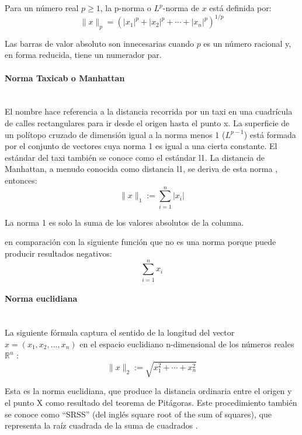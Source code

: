 \documentclass[12pt]{article}
\newcommand{\subsubsubsection}[1]{\paragraph{#1}\mbox{}\\}
\begin{document}
			Para un número real $p \geq 1$, la p-norma o $L^p$-norma de $x$ está definida por:
			\begin{equation}\label{eq:Norma_Lp}
			\parallel x \parallel_p = (|x_{1}|^{p}+|x_{2}|^{p}+\dotsb +|x_{n}|^{p})^{1/p}
			\end{equation}
			
			Las barras de valor absoluto son innecesarias cuando $p$ es un número racional y, en forma reducida, tiene un numerador par.
			
			
			
			\subsubsubsection{Norma Taxicab o Manhattan}
			El nombre hace referencia a la distancia recorrida por un taxi en una cuadrícula de calles rectangulares para ir desde el origen hasta el punto x. La superficie de un polítopo cruzado de dimensión igual a la norma menos 1 ($L^{p-1}$) está formada por el conjunto de vectores cuya norma 1 es igual a una cierta constante. El estándar del taxi también se conoce como el estándar l1. La distancia de Manhattan, a menudo conocida como distancia l1, se deriva de esta norma \cite{Nelson2010}, entonces:
			\begin{equation}\label{eq:Norma_L1}
			\parallel x \parallel_1 := \sum_{i=1}^n |x_i|
			\end{equation}

			La norma 1 es solo la suma de los valores absolutos de la columna.
			
			en comparación con la siguiente función que no es una norma porque puede producir resultados negativos:
			\begin{equation}\label{eq:Norma_L1_not}
			\sum_{i=1}^n x_i
			\end{equation}



			\subsubsubsection{Norma euclidiana}	
			La siguiente fórmula captura el sentido de la longitud del vector $x = (x_1, x_2, ..., x_n)$ en el espacio euclidiano n-dimensional de los números reales $\mathbb{R}^{n}$ \cite{Weisstein2002}:
			\begin{equation}\label{eq:Norma_L2}
			\parallel x \parallel_2 := \sqrt {x_{1}^{2}+\cdots +x_{n}^{2}}
			\end{equation}
			
			Esta es la norma euclidiana, que produce la distancia ordinaria entre el origen y el punto X como resultado del teorema de Pitágoras. Este procedimiento también se conoce como ``SRSS'' (del inglés square root of the sum of squares), que representa la raíz cuadrada de la suma de cuadrados \cite{Chopra2007}.
										
\end{document}
